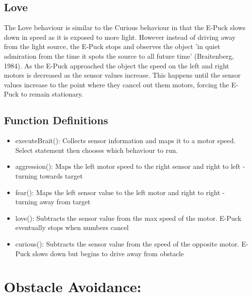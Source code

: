 \documentclass[11pt]{article}
\begin{document}
\subsection*{Love}

The Love behaviour is similar to the Curious behaviour in that the E-Puck slows down in speed as it is exposed to more light. However instead of driving away from the light source, the E-Puck stops and observes the object 'in quiet admiration from the time it spots the source to all future time' (Braitenberg, 1984). As the E-Puck approached the object the speed on the left and right motors is decreased as the sensor values increase. This happens until the sensor values increase to the point where they cancel out them motors, forcing the E-Puck to remain stationary.

\subsection*{Function Definitions}

\begin{itemize}
\item{executeBrait(): Collects sensor information and maps it to a motor speed. Select statement then chooses which behaviour to run.}
\item{aggression(): Maps the left motor speed to the right sensor and right to left - turning towards target}
\item{fear(): Maps the left sensor value to the left motor and right to right - turning away from target}
\item{love(): Subtracts the sensor value from the max speed of the motor. E-Puck eventually stops when numbers cancel}
\item{curious(): Subtracts the sensor value from the speed of the opposite motor. E-Puck slows down but begins to drive away from obstacle}
\end{itemize}

\section*{Obstacle Avoidance:}
\end{document}
